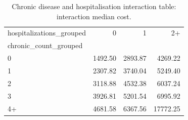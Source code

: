 \begin{table}
\caption{Chronic disease and hospitalisation interaction table: interaction median cost.}
\label{tab:02-interaction-median-cost}
\begin{tabular}{lrrr}
\toprule
hospitalizations_grouped & 0 & 1 & 2+ \\
chronic_count_grouped &  &  &  \\
\midrule
0 & 1492.50 & 2893.87 & 4269.22 \\
1 & 2307.82 & 3740.04 & 5249.40 \\
2 & 3118.88 & 4532.38 & 6037.24 \\
3 & 3926.81 & 5201.54 & 6995.92 \\
4+ & 4681.58 & 6367.56 & 17772.25 \\
\bottomrule
\end{tabular}
\end{table}

